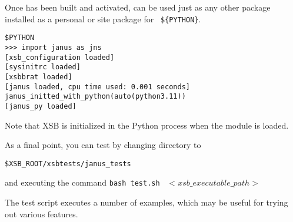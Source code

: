 Once \janus{} has been built and activated, \janus{} can be used just
as any other package installed as a personal or site package for {\tt
  \$\{PYTHON\}}.

\begin{verbatim}
$PYTHON
>>> import janus as jns
[xsb_configuration loaded]
[sysinitrc loaded]
[xsbbrat loaded]
[janus loaded, cpu time used: 0.001 seconds]
janus_initted_with_python(auto(python3.11))
[janus_py loaded]
\end{verbatim}

\noindent
Note that XSB is initialized in the Python process when the \janus{}
module is loaded.

As a final point, you can test \januspy{} by changing directory to

{\tt \$XSB\_ROOT/xsbtests/janus\_tests}

and executing the command {\tt bash test.sh } $< xsb\_executable\_path>$
   
The test script executes a number of \janus{} examples, which may be
useful for trying out various features.






%



